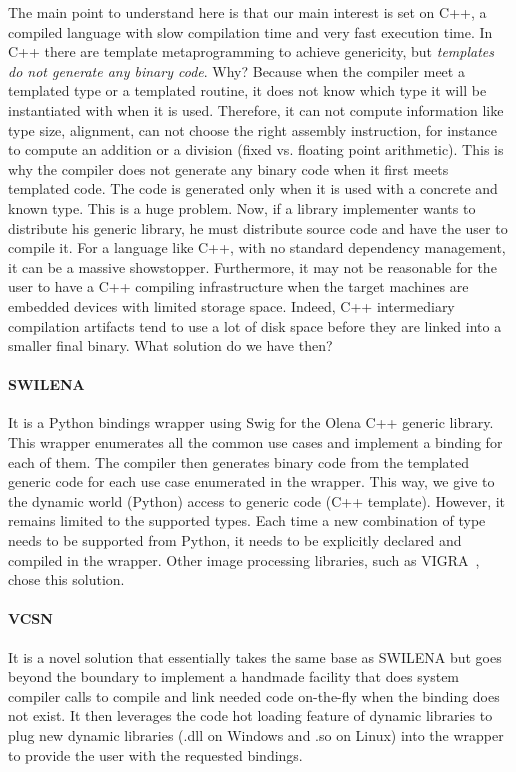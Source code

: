 The main point to understand here is that our main interest is set on C++, a compiled language with slow compilation
time and very fast execution time. In C++ there are template metaprogramming to achieve genericity, but \emph{templates
  do not generate any binary code}. Why? Because when the compiler meet a templated type or a templated routine, it does
not know which type it will be instantiated with when it is used. Therefore, it can not compute information like type
size, alignment, can not choose the right assembly instruction, for instance to compute an addition or a division (fixed
vs. floating point arithmetic). This is why the compiler does not generate any binary code when it first meets templated
code. The code is generated only when it is used with a concrete and known type. This is a huge problem. Now, if a
library implementer wants to distribute his generic library, he must distribute source code and have the user to compile
it. For a language like C++, with no standard dependency management, it can be a massive showstopper. Furthermore, it
may not be reasonable for the user to have a C++ compiling infrastructure when the target machines are embedded devices
with limited storage space. Indeed, C++ intermediary compilation artifacts tend to use a lot of disk space before they
are linked into a smaller final binary. What solution do we have then?

\paragraph{SWILENA~\parencite{beazley.1996.swig,olena.2000.www}} It is a Python bindings wrapper using Swig for the
Olena C++ generic library. This wrapper enumerates all the common use cases and implement a binding for each of them.
The compiler then generates binary code from the templated generic code for each use case enumerated in the wrapper.
This way, we give to the dynamic world (Python) access to generic code (C++ template). However, it remains limited to
the supported types. Each time a new combination of type needs to be supported from Python, it needs to be explicitly
declared and compiled in the wrapper. Other image processing libraries, such as VIGRA~\parencite{kothe.2011.generic},
chose this solution.

\paragraph{VCSN~\parencite{demaille.2013.vcsn}} It is a novel solution that essentially takes the same base as SWILENA
but goes beyond the boundary to implement a handmade facility that does system compiler calls to compile and link needed
code on-the-fly when the binding does not exist. It then leverages the code hot loading feature of dynamic libraries to
plug new dynamic libraries (.dll on Windows and .so on Linux) into the wrapper to provide the user with the requested
bindings.


